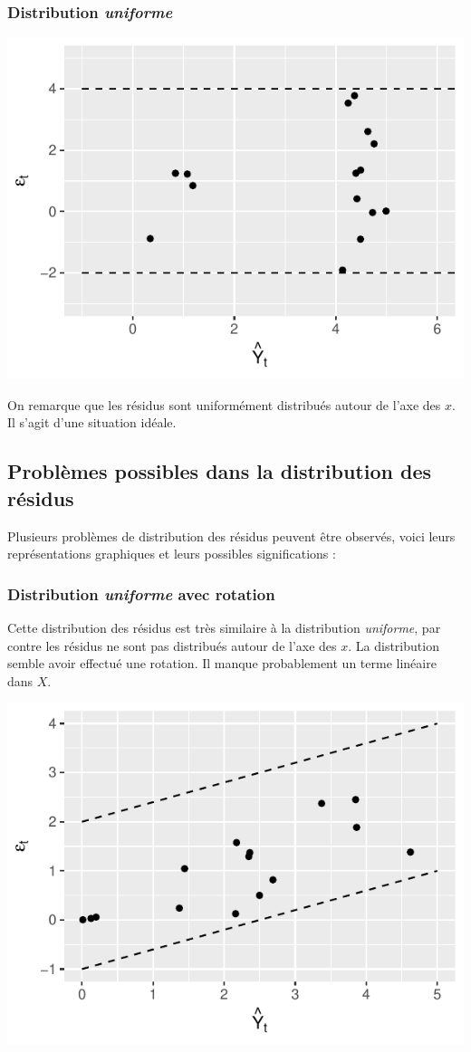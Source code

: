 \documentclass[11pt,french]{report}
\begin{document}
\subsubsection*{Distribution \emph{uniforme}}
\includegraphics{notes_de_cours-030}

\bigskip
On remarque que les résidus sont uniformément distribués autour de l'axe des $x$. Il s'agit d'une situation idéale.

\subsection{Problèmes possibles dans la distribution des résidus}
Plusieurs problèmes de distribution des résidus peuvent être observés, voici leurs représentations graphiques et leurs possibles significations :

\subsubsection{Distribution \emph{uniforme} avec rotation}
Cette distribution des résidus est très similaire à la distribution \emph{uniforme}, par contre les résidus ne sont pas distribués autour de l'axe des $x$. La distribution semble avoir effectué une rotation. Il manque probablement un terme linéaire dans $X$.

\bigskip
\includegraphics{notes_de_cours-031}
\bigskip
\end{document}

